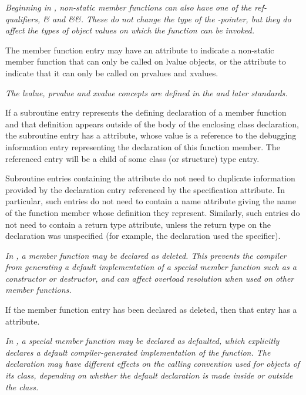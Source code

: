 \textit{Beginning in , non-static member
functions can also have one of the ref-qualifiers, \& and \&\&.
These do not change the type of the
-pointer, but they do affect the types of
object values on which the function can be invoked.}

The member function entry may have an \DWATreferenceDEFN{} attribute
to indicate a non-static member function that can only be called on
lvalue objects, or the \DWATrvaluereferenceDEFN{} attribute
to indicate that it can only be called on prvalues and xvalues.

\textit{The lvalue, prvalue and xvalue concepts are defined in the
 and later standards.}

If a subroutine entry represents the defining declaration
of a member function and that definition appears outside of
the body of the enclosing class declaration, the subroutine
entry has a
\DWATspecification{} attribute,
whose value is
a reference to the debugging information entry representing
the declaration of this function member. The referenced entry
will be a child of some class (or structure) type entry.

Subroutine entries containing the
\DWATspecification{} attribute
do not need to duplicate information provided
by the declaration entry referenced by the specification
attribute. In particular, such entries do not need to contain
a name attribute giving the name of the function member whose
definition they represent.
Similarly, such entries do not need to contain a return type
attribute, unless the return type on the declaration was
unspecified (for example, the declaration used the
 \autoreturntype{} specifier).

\textit{In , a member function may be declared
as deleted. This prevents the compiler from generating a default
implementation of a special member function such as a
constructor or destructor, and can affect overload resolution
when used on other member functions.}

If the member function entry has been declared as deleted,
then that entry has a \DWATdeletedDEFN{}
attribute.

\textit{In , a special member function may be
declared as defaulted, which explicitly declares a default
compiler-generated implementation of the function. The
declaration may have different effects on the calling
convention used for objects of its class, depending on
whether the default declaration is made inside or outside the
class.}

